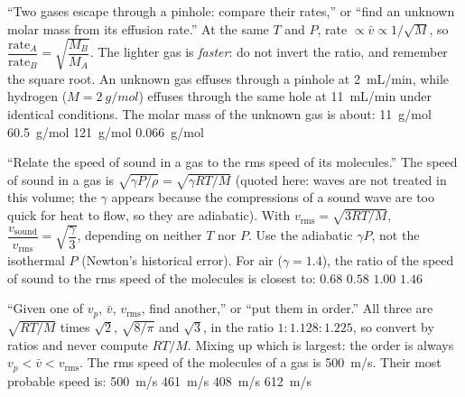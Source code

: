{``Two gases escape through a pinhole: compare their rates,'' or ``find an unknown molar mass from its
effusion rate.''}
{At the same $T$ and $P$, rate $\propto\bar v\propto1/\sqrt M$, so
$\dfrac{\text{rate}_A}{\text{rate}_B}=\sqrt{\dfrac{M_B}{M_A}}$.}
{The lighter gas is \emph{faster}: do not invert the ratio, and remember the square root.}
{An unknown gas effuses through a pinhole at \SI{2}{mL/min}, while hydrogen ($M=\SI{2}{g/mol}$) effuses
through the same hole at \SI{11}{mL/min} under identical conditions. The molar mass of the unknown gas is
about:}
{\SI{11}{g/mol}}
{\SI{60.5}{g/mol}}
{\SI{121}{g/mol}}
{\SI{0.066}{g/mol}}

{``Relate the speed of sound in a gas to the rms speed of its molecules.''}
{The speed of sound in a gas is $\sqrt{\gamma P/\rho}=\sqrt{\gamma RT/M}$ (quoted here: waves are not
treated in this volume; the $\gamma$ appears because the compressions of a sound wave are too quick for
heat to flow, so they are adiabatic). With $v_{\text{rms}}=\sqrt{3RT/M}$,
$\dfrac{v_{\text{sound}}}{v_{\text{rms}}}=\sqrt{\dfrac{\gamma}{3}}$, depending on neither $T$ nor $P$.}
{Use the adiabatic $\gamma P$, not the isothermal $P$ (Newton's historical error).}
{For air ($\gamma=1.4$), the ratio of the speed of sound to the rms speed of the molecules is closest to:}
{$0.68$}
{$0.58$}
{$1.00$}
{$1.46$}

{``Given one of $v_p$, $\bar v$, $v_{\text{rms}}$, find another,'' or ``put them in order.''}
{All three are $\sqrt{RT/M}$ times $\sqrt2$, $\sqrt{8/\pi}$ and $\sqrt3$, in the ratio
$1:1.128:1.225$, so convert by ratios and never compute $RT/M$.}
{Mixing up which is largest: the order is always $v_p<\bar v<v_{\text{rms}}$.}
{The rms speed of the molecules of a gas is \SI{500}{m/s}. Their most probable speed is:}
{\SI{500}{m/s}}
{\SI{461}{m/s}}
{\SI{408}{m/s}}
{\SI{612}{m/s}}

